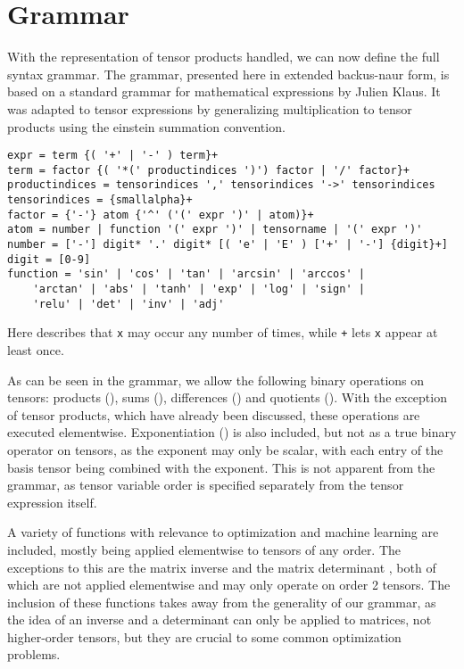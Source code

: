 \documentclass[12pt, a4paper]{report}
\begin{document}
\section{Grammar}
With the representation of tensor products handled, we can now define the full syntax grammar.
The grammar, presented here in extended backus-naur form, is based on a standard grammar for mathematical expressions by Julien Klaus.
It was adapted to tensor expressions by generalizing multiplication to tensor products using the einstein summation convention.
\begin{verbatim}
expr = term {( '+' | '-' ) term}+
term = factor {( '*(' productindices ')') factor | '/' factor}+
productindices = tensorindices ',' tensorindices '->' tensorindices
tensorindices = {smallalpha}+
factor = {'-'} atom {'^' ('(' expr ')' | atom)}+
atom = number | function '(' expr ')' | tensorname | '(' expr ')'
number = ['-'] digit* '.' digit* [( 'e' | 'E' ) ['+' | '-'] {digit}+]
digit = [0-9]
function = 'sin' | 'cos' | 'tan' | 'arcsin' | 'arccos' | 
    'arctan' | 'abs' | 'tanh' | 'exp' | 'log' | 'sign' | 
    'relu' | 'det' | 'inv' | 'adj'
\end{verbatim}
Here \texttt{} describes that \texttt{x} may occur any number of times, while \texttt{+} lets \texttt{x} appear at least once.

As can be seen in the grammar, we allow the following binary operations on tensors: products (\codeword{*(,->)}), sums (\codeword{+}), differences (\codeword{-}) and quotients (\codeword{/}).
With the exception of tensor products, which have already been discussed, these operations are executed elementwise.
Exponentiation (\codeword{^}) is also included, but not as a true binary operator on tensors, as the exponent may only be scalar, with each entry of the basis tensor being combined with the exponent.
This is not apparent from the grammar, as tensor variable order is specified separately from the tensor expression itself.

A variety of functions with relevance to optimization and machine learning are included, mostly being applied elementwise to tensors of any order.
The exceptions to this are the matrix inverse  and the matrix determinant , both of which are not applied elementwise and may only operate on order 2 tensors.
The inclusion of these functions takes away from the generality of our grammar, as the idea of an inverse and a determinant can only be applied to matrices, not higher-order tensors, but they are crucial to some common optimization problems.
\end{document}
